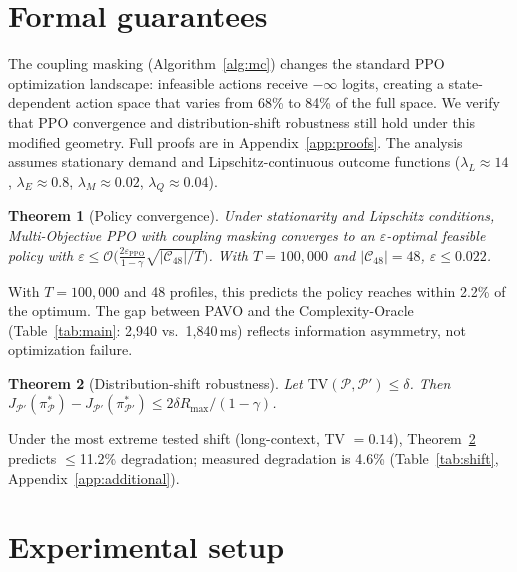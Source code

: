 \documentclass{article}
\newtheorem{theorem}{Theorem}
\begin{document}
\section{Formal guarantees}
\label{sec:theory}

The coupling masking (Algorithm~\ref{alg:mc}) changes the standard PPO optimization landscape: infeasible actions receive $-\infty$ logits, creating a state-dependent action space that varies from 68\% to 84\% of the full space. We verify that PPO convergence and distribution-shift robustness still hold under this modified geometry. Full proofs are in Appendix~\ref{app:proofs}. The analysis assumes stationary demand and Lipschitz-continuous outcome functions ($\lambda_L\approx 14$, $\lambda_E\approx 0.8$, $\lambda_M\approx 0.02$, $\lambda_Q\approx 0.04$).

\begin{theorem}[Policy convergence]
\label{thm:conv}
Under stationarity and Lipschitz conditions, Multi-Objective PPO with coupling masking converges to an $\varepsilon$-optimal feasible policy with $\varepsilon \leq \mathcal{O}\!\bigl(\frac{2\varepsilon_{\mathrm{PPO}}}{1-\gamma}\sqrt{|\mathcal{C}_{48}|/T}\bigr)$. With $T=100{,}000$ and $|\mathcal{C}_{48}|=48$, $\varepsilon\leq0.022$.
\end{theorem}

With $T=100{,}000$ and 48 profiles, this predicts the policy reaches within 2.2\% of the optimum. The gap between PAVO and the Complexity-Oracle (Table~\ref{tab:main}: 2{,}940 vs.\ 1{,}840\,ms) reflects information asymmetry, not optimization failure.

\begin{theorem}[Distribution-shift robustness]
\label{thm:robust}
Let $\mathrm{TV}(\mathcal{P},\mathcal{P}')\leq\delta$. Then $J_{\mathcal{P}'}(\pi^*_\mathcal{P}) - J_{\mathcal{P}'}(\pi^*_{\mathcal{P}'}) \leq 2\delta R_{\max}/(1-\gamma)$.
\end{theorem}

Under the most extreme tested shift (long-context, TV $= 0.14$), Theorem~\ref{thm:robust} predicts $\leq$11.2\% degradation; measured degradation is 4.6\% (Table~\ref{tab:shift}, Appendix~\ref{app:additional}).

\section{Experimental setup}
\label{sec:exp}
\end{document}
